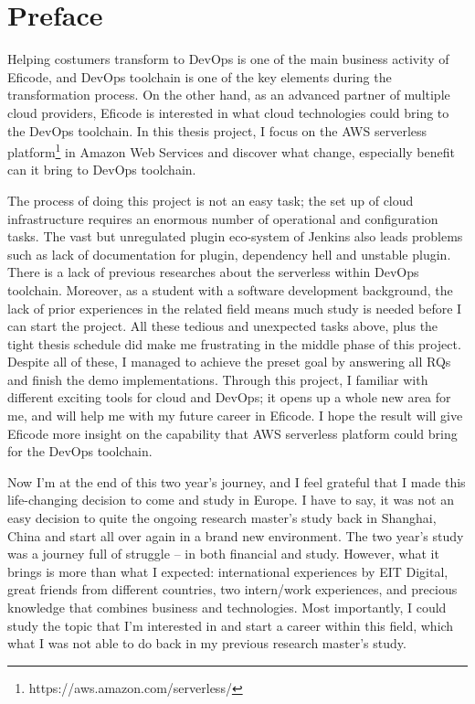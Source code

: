\chapter*{Preface}
Helping costumers transform to DevOps is one of the main business activity of Eficode, and DevOps toolchain is one of the key elements during the transformation process.
On the other hand, as an advanced partner of multiple cloud providers, Eficode is interested in what cloud technologies could bring to the DevOps toolchain. In this thesis project, I focus on the AWS serverless platform\footnote{https://aws.amazon.com/serverless/} in Amazon Web Services and discover what change, especially benefit can it bring to DevOps toolchain.

The process of doing this project is not an easy task; the set up of cloud infrastructure requires an enormous number of operational and configuration tasks. The vast but unregulated plugin eco-system of Jenkins also leads problems such as lack of documentation for plugin, dependency hell and unstable plugin. There is a lack of previous researches about the serverless within DevOps toolchain. Moreover, as a student with a software development background, the lack of prior experiences in the related field means much study is needed before I can start the project. All these tedious and unexpected tasks above, plus the tight thesis schedule did make me frustrating in the middle phase of this project. Despite all of these, I managed to achieve the preset goal by answering all RQs and finish the demo implementations. Through this project, I familiar with different exciting tools for cloud and DevOps; it opens up a whole new area for me, and will help me with my future career in Eficode. I hope the result will give Eficode more insight on the capability that AWS serverless platform could bring for the DevOps toolchain.
\vspace{1\baselineskip}

\noindent
Now I'm at the end of this two year's journey, and I feel grateful that I made this life-changing decision to come and study in Europe. I have to say, it was not an easy decision to quite the ongoing research master's study back in Shanghai, China and start all over again in a brand new environment. The two year's study was a journey full of struggle -- in both financial and study. However, what it brings is more than what I expected: international experiences by EIT Digital, great friends from different countries, two intern/work experiences, and precious knowledge that combines business and technologies. Most importantly, I could study the topic that I'm interested in and start a career within this field, which what I was not able to do back in my previous research master's study.

